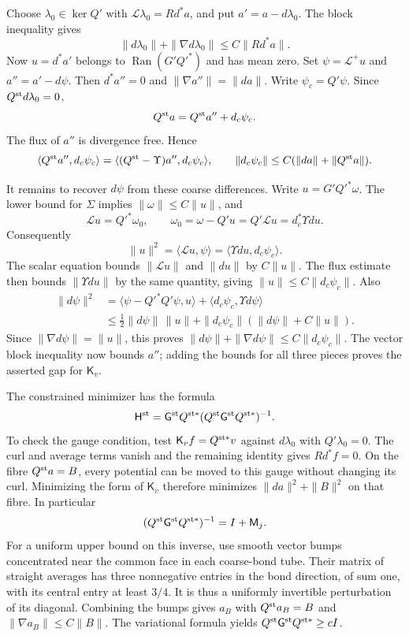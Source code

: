 \documentclass[11pt,letterpaper,reqno]{amsart}
\theoremstyle{definition}
\theoremstyle{remark}
\begin{document}
Choose $\lambda_0\in\ker Q'$ with
$\mathcal L\lambda_0=Rd^*a$, and put $a'=a-d\lambda_0$.
The block inequality gives
\[
 \|d\lambda_0\|+\|\nabla d\lambda_0\|
                                      \le C\|Rd^*a\|.
\]
Now $u=d^*a'$ belongs to $\operatorname{Ran}(G'Q'^*)$ and
has mean zero. Set $\psi=\mathcal L^+u$ and
$a''=a'-d\psi$. Then $d^*a''=0$ and
$\|\nabla a''\|=\|da\|$. Write $\psi_c=Q'\psi$. Since
$Q^{\rm st}d\lambda_0=0$,
\[
 Q^{\rm st}a=Q^{\rm st}a''+d_c\psi_c.
\]
The flux of $a''$ is divergence free. Hence
\[
 \langle Q^{\rm st}a'',d_c\psi_c\rangle
 =\langle(Q^{\rm st}-\Upsilon)a'',d_c\psi_c\rangle,
 \qquad
 \|d_c\psi_c\|\le C(\|da\|+\|Q^{\rm st}a\|).
\]

It remains to recover $d\psi$ from these coarse differences.
Write $u=G'Q'^*\omega$. The lower bound for $\Sigma$ implies
$\|\omega\|\le C\|u\|$, and
\[
 \mathcal Lu=Q'^*\omega_0,\qquad
 \omega_0=\omega-Q'u=Q'\mathcal Lu=d_c^*\Upsilon du.
\]
Consequently
\[
 \|u\|^2=\langle\mathcal Lu,\psi\rangle
        =\langle\Upsilon du,d_c\psi_c\rangle.
\]
The scalar equation bounds $\|\mathcal Lu\|$ and $\|du\|$
by $C\|u\|$. The flux estimate then bounds
$\|\Upsilon du\|$ by the same quantity, giving
$\|u\|\le C\|d_c\psi_c\|$. Also
\[
 \begin{split}
 \|d\psi\|^2
 &=\langle\psi-Q'^*Q'\psi,u\rangle
                    +\langle d_c\psi_c,\Upsilon d\psi\rangle\\
 &\le\tfrac12\|d\psi\|\,\|u\|
   +\|d_c\psi_c\|(\|d\psi\|+C\|u\|).
 \end{split}
\]
Since $\|\nabla d\psi\|=\|u\|$, this proves
$\|d\psi\|+\|\nabla d\psi\|\le C\|d_c\psi_c\|$.
The vector block inequality now bounds $a''$; adding the bounds
for all three pieces proves the asserted gap for $\mathsf K_v$.

The constrained minimizer has the formula
\[
 \mathsf H^{\rm st}
 =\mathsf G^{\rm st}Q^{{\rm st}*}
       (Q^{\rm st}\mathsf G^{\rm st}Q^{{\rm st}*})^{-1}.
\]
To check the gauge condition, test
$\mathsf K_vf=Q^{{\rm st}*}v$ against $d\lambda_0$ with
$Q'\lambda_0=0$. The curl and average terms vanish and the
remaining identity gives $Rd^*f=0$. On the fibre
$Q^{\rm st}a=B$, every potential can be moved to this gauge
without changing its curl. Minimizing the form of $\mathsf K_v$
therefore minimizes $\|da\|^2+\|B\|^2$ on that fibre. In
particular
\[
 (Q^{\rm st}\mathsf G^{\rm st}Q^{{\rm st}*})^{-1}
                                      =I+\mathsf M_j.
\]
For a uniform upper bound on this inverse, use smooth vector bumps
concentrated near the common face in each coarse-bond tube. Their
matrix of straight averages has three nonnegative entries in the
bond direction, of sum one, with its central entry at least
$3/4$. It is thus a uniformly invertible perturbation of its
diagonal. Combining the bumps gives $a_B$ with
$Q^{\rm st}a_B=B$ and $\|\nabla a_B\|\le C\|B\|$.
The variational formula yields
$Q^{\rm st}\mathsf G^{\rm st}Q^{{\rm st}*}\ge cI$.
\end{document}
